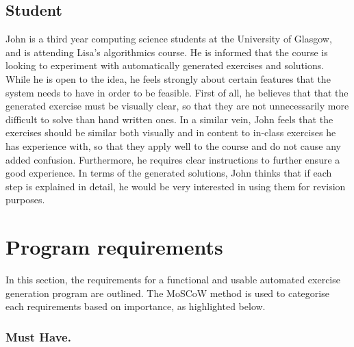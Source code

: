 \documentclass{l4proj}
\begin{document}
\subsection{Student}

John is a third year computing science students at the University of Glasgow, and is attending Lisa's algorithmics course. He is informed that the course is looking to experiment with automatically generated exercises and solutions. While he is open to the idea, he feels strongly about certain features that the system needs to have in order to be feasible. First of all, he believes that that the generated exercise must be visually clear, so that they are not unnecessarily more difficult to solve than hand written ones. In a similar vein, John feels that the exercises should be similar both visually and in content to in-class exercises he has experience with, so that they apply well to the course and do not cause any added confusion. Furthermore, he requires clear instructions to further ensure a good experience. In terms of the generated solutions, John thinks that if each step is explained in detail, he would be very interested in using them for revision purposes.

\section{Program requirements}

In this section, the requirements for a functional and usable automated exercise generation program are outlined. The MoSCoW method is used to categorise each requirements based on importance, as highlighted below.

\subsubsection{Must Have.}
\end{document}

